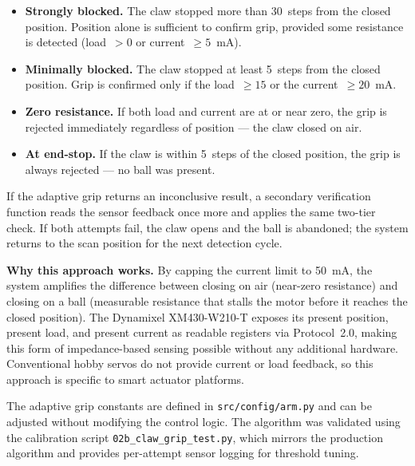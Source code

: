 \begin{itemize}
    \item \textbf{Strongly blocked.} The claw stopped more than
    30~steps from the closed position. Position alone is
    sufficient to confirm grip, provided some resistance is
    detected (load~$> 0$ or current~$\geq 5$~mA).

    \item \textbf{Minimally blocked.} The claw stopped at least
    5~steps from the closed position. Grip is confirmed only if
    the load~$\geq 15$ or the current~$\geq 20$~mA.

    \item \textbf{Zero resistance.} If both load and current are
    at or near zero, the grip is rejected immediately regardless
    of position --- the claw closed on air.

    \item \textbf{At end-stop.} If the claw is within 5~steps of
    the closed position, the grip is always rejected --- no ball
    was present.
\end{itemize}

If the adaptive grip returns an inconclusive result, a secondary
verification function reads the sensor feedback once more and
applies the same two-tier check. If both attempts fail, the claw
opens and the ball is abandoned; the system returns to the scan
position for the next detection cycle.

\textbf{Why this approach works.} By capping the current limit to
50~mA, the system amplifies the difference between closing on air
(near-zero resistance) and closing on a ball (measurable resistance
that stalls the motor before it reaches the closed position). The
Dynamixel XM430-W210-T exposes its present position, present load,
and present current as readable registers via Protocol~2.0, making
this form of impedance-based sensing possible without any additional
hardware. Conventional hobby servos do not provide current or load
feedback, so this approach is specific to smart actuator platforms.

The adaptive grip constants are defined in
\texttt{src/config/arm.py} and can be adjusted without modifying
the control logic. The algorithm was validated using the
calibration script \texttt{02b\_claw\_grip\_test.py}, which mirrors
the production algorithm and provides per-attempt sensor logging
for threshold tuning.

